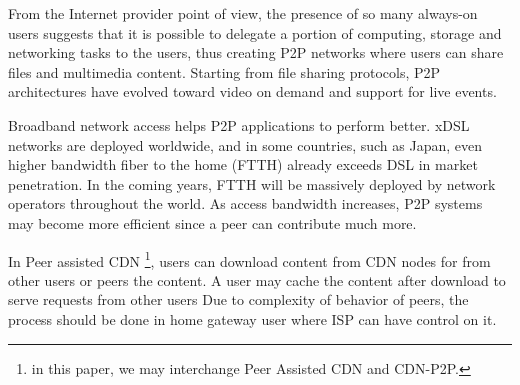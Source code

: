 \documentclass[conference]{IEEEtran}
\begin{document}
From the Internet provider point of view, the presence of so many always-on users suggests that it is possible to delegate a portion of computing, storage and networking tasks to the users, thus creating P2P networks where users can share files and multimedia content.
Starting from file sharing protocols, P2P architectures have evolved toward video on demand and support for live events.

Broadband network access helps P2P applications to perform better.
xDSL networks are deployed worldwide, and in some countries, such as Japan, even higher bandwidth fiber to the home (FTTH) already exceeds DSL in market penetration.  In the coming years, FTTH will be massively deployed by network operators throughout the world.  
As access bandwidth increases, P2P systems may become more efficient since a peer can contribute much more.

In Peer assisted CDN \footnote{in this paper, we may interchange Peer Assisted CDN and CDN-P2P.}, users can download content from CDN nodes for from other users or peers the content.
A user may cache the content after download to serve requests from other users
Due to complexity of behavior of peers, the process should be done in home gateway user where ISP can have control on it. 
\end{document}
